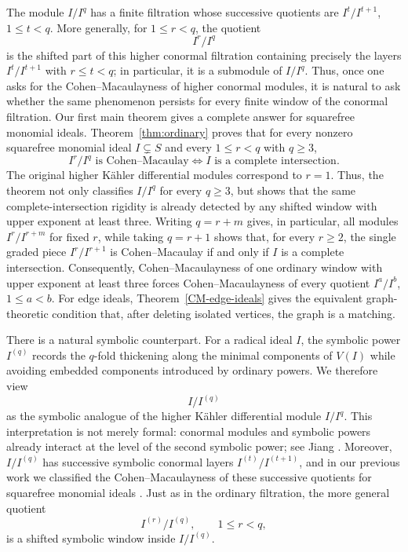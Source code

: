 \documentclass[12pt]{amsart}
\theoremstyle{plain}
\theoremstyle{definition}
\theoremstyle{remark}
\begin{document}
The module $I/I^q$ has a finite filtration whose successive quotients are
$I^t/I^{t+1}$, $1\le t<q$. More generally, for $1\le r<q$, the quotient
$$
I^r/I^q
$$
is the shifted part of this higher conormal filtration containing precisely
the layers $I^t/I^{t+1}$ with $r\le t<q$; in particular, it is a submodule of
$I/I^q$. Thus, once one asks for the Cohen--Macaulayness of higher conormal
modules, it is natural to ask whether the same phenomenon persists for every
finite window of the conormal filtration. Our first main theorem gives a
complete answer for squarefree monomial ideals. Theorem~\ref{thm:ordinary}
proves that for every nonzero squarefree monomial ideal $I\subsetneq S$ and
every $1\le r<q$ with $q\ge3$,
$$
I^r/I^q\text{ is Cohen--Macaulay}
\Longleftrightarrow
I\text{ is a complete intersection}.
$$
The original higher K\"ahler differential modules correspond to $r=1$.
Thus, the theorem not only classifies $I/I^q$ for every $q\ge3$, but shows that
the same complete-intersection rigidity is already detected by any shifted
window with upper exponent at least three. Writing $q=r+m$ gives, in
particular, all modules $I^r/I^{r+m}$ for fixed $r$, while taking $q=r+1$
shows that, for every $r\ge2$, the single graded piece $I^r/I^{r+1}$ is
Cohen--Macaulay if and only if $I$ is a complete intersection. Consequently,
Cohen--Macaulayness of one ordinary window with upper exponent at least three
forces Cohen--Macaulayness of every quotient $I^a/I^b$, $1\le a<b$. For edge
ideals, Theorem~\ref{CM-edge-ideals} gives the equivalent graph-theoretic
condition that, after deleting isolated vertices, the graph is a matching.

There is a natural symbolic counterpart. For a radical ideal $I$, the symbolic
power $I^{(q)}$ records the $q$-fold thickening along the minimal components of
$V(I)$ while avoiding embedded components introduced by ordinary powers. We
therefore view
$$
I/I^{(q)}
$$
as the symbolic analogue of the higher K\"ahler differential module $I/I^q$.
This interpretation is not merely formal: conormal modules and symbolic powers
already interact at the level of the second symbolic power; see Jiang
\cite{Jiang}. Moreover, $I/I^{(q)}$ has successive symbolic conormal layers
$I^{(t)}/I^{(t+1)}$, and in our previous work we classified the
Cohen--Macaulayness of these successive quotients for squarefree monomial
ideals \cite{HaMinh}. Just as in the ordinary filtration, the more general
quotient
$$
I^{(r)}/I^{(q)},\qquad 1\le r<q,
$$
is a shifted symbolic window inside $I/I^{(q)}$.
\end{document}
